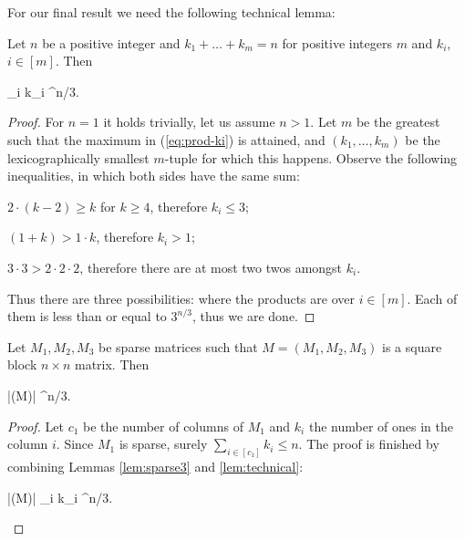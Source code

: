 For our final result we need the following technical lemma:

\begin{lem}
\label{lem:technical}
Let $n$ be a positive integer and $k_1 + \dots + k_m = n$ for positive integers $m$ and $k_i$, $i \in [m]$. Then
\begin{cosyeqnarray}
	\prod_{i \in [m]} k_i ^{n/3}.\label{eq:prod-ki}
\end{cosyeqnarray}%
\end{lem}
\begin{proof}
For $n=1$ it holds trivially, let us assume $n > 1$. Let $m$ be the greatest such that the maximum in (\ref{eq:prod-ki}) is attained, and $(k_1, \dots, k_m)$ be the lexicographically smallest $m$-tuple for which this happens. Observe the following inequalities, in which both sides have the same sum:
\begin{cosyitemize}
	\item $2 \cdot (k-2) \geq k$ for $k \geq 4$, therefore $k_i \leq 3$;
	\item $(1+k) > 1 \cdot k$, therefore $k_i > 1$;
	\item $3 \cdot 3 > 2 \cdot 2 \cdot 2$, therefore there are at most two twos amongst $k_i$.
\end{cosyitemize}%
Thus there are three possibilities:
%
where the products are over $i \in [m]$. Each of them is less than or equal to $3^{n/3}$, thus we are done.
\end{proof}

\begin{lem}
\label{lem:3-block-sparse-det}
Let $M_1,M_2,M_3$ be sparse matrices such that $M = (M_1,M_2,M_3)$ is a  square block $n \times n$ matrix. Then
\begin{cosyeqnarray}
 	|\det(M)| ^{n/3}.
\end{cosyeqnarray}%
\end{lem}
\begin{proof}
Let $c_1$ be the number of columns of $M_1$ and $k_i$ the number of ones in the column $i$. Since $M_1$ is sparse, surely $\sum_{i \in [c_1]} k_i \leq n$. The proof is finished by combining Lemmas \ref{lem:sparse3} and \ref{lem:technical}:
\begin{cosyeqnarray}
	|\det(M)| \leq \prod_{i \in [c_1]} k_i ^{n/3}.
\end{cosyeqnarray}%
\end{proof}

